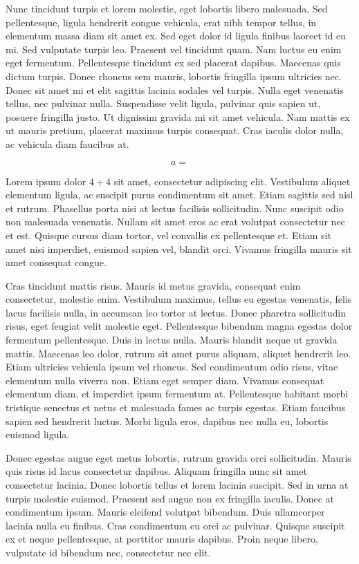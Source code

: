 Nunc tincidunt turpis et lorem molestie, eget lobortis libero malesuada. Sed pellentesque, ligula hendrerit congue vehicula, erat nibh tempor tellus, in elementum massa diam sit amet ex. Sed eget dolor id ligula finibus laoreet id eu mi. Sed vulputate turpis leo. Praesent vel tincidunt quam. Nam luctus eu enim eget fermentum. Pellentesque tincidunt ex sed placerat dapibus. Maecenas quis dictum turpis. Donec rhoncus sem mauris, lobortis fringilla ipsum ultricies nec. Donec sit amet mi et elit sagittis lacinia sodales vel turpis. Nulla eget venenatis tellus, nec pulvinar nulla. Suspendisse velit ligula, pulvinar quis sapien ut, posuere fringilla justo. Ut dignissim gravida mi sit amet vehicula. Nam mattis ex ut mauris pretium, placerat maximus turpis consequat. Cras iaculis dolor nulla, ac vehicula diam faucibus at.



$$a =$$

Lorem ipsum dolor $4 + 4$ sit amet, consectetur adipiscing elit. Vestibulum aliquet elementum ligula, ac suscipit purus condimentum sit amet. Etiam sagittis sed nisl et rutrum. Phasellus porta nisi at lectus facilisis sollicitudin. Nunc suscipit odio non malesuada venenatis. Nullam sit amet eros ac erat volutpat consectetur nec et est. Quisque cursus diam tortor, vel convallis ex pellentesque et. Etiam sit amet nisi imperdiet, euismod sapien vel, blandit orci. Vivamus fringilla mauris sit amet consequat congue.

Cras tincidunt mattis risus. Mauris id metus gravida, consequat enim consectetur, molestie enim. Vestibulum maximus, tellus eu egestas venenatis, felis lacus facilisis nulla, in accumsan leo tortor at lectus. Donec pharetra sollicitudin risus, eget feugiat velit molestie eget. Pellentesque bibendum magna egestas dolor fermentum pellentesque. Duis in lectus nulla. Mauris blandit neque ut gravida mattis. Maecenas leo dolor, rutrum sit amet purus aliquam, aliquet hendrerit leo. Etiam ultricies vehicula ipsum vel rhoncus. Sed condimentum odio risus, vitae elementum nulla viverra non. Etiam eget semper diam. Vivamus consequat elementum diam, et imperdiet ipsum fermentum at. Pellentesque habitant morbi tristique senectus et netus et malesuada fames ac turpis egestas. Etiam faucibus sapien sed hendrerit luctus. Morbi ligula eros, dapibus nec nulla eu, lobortis euismod ligula.

Donec egestas augue eget metus lobortis, rutrum gravida orci sollicitudin. Mauris quis risus id lacus consectetur dapibus. Aliquam fringilla nunc sit amet consectetur lacinia. Donec lobortis tellus et lorem lacinia suscipit. Sed in urna at turpis molestie euismod. Praesent sed augue non ex fringilla iaculis. Donec at condimentum ipsum. Mauris eleifend volutpat bibendum. Duis ullamcorper lacinia nulla eu finibus. Cras condimentum eu orci ac pulvinar. Quisque suscipit ex et neque pellentesque, at porttitor mauris dapibus. Proin neque libero, vulputate id bibendum nec, consectetur nec elit.

